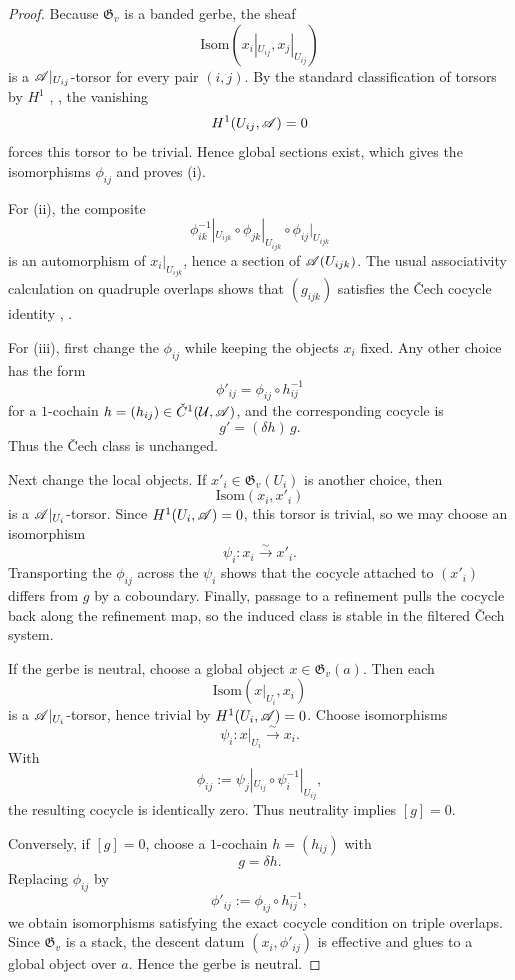 \begin{proof}
Because $\mathfrak G_v$ is a banded gerbe, the sheaf
\[
\mathrm{Isom}(x_i|_{U_{ij}},x_j|_{U_{ij}})
\]
is a $\mathscr{A}|_{U_{ij}}$-torsor for every pair $(i,j)$. By the standard classification of torsors by $H^1$ \cite[Chap.~III]{MacLaneMoerdijk1994}, \cite[Sec.~11]{StacksProject}, the vanishing
\[
H^1(U_{ij},\mathscr{A})=0
\]
forces this torsor to be trivial. Hence global sections exist, which gives the isomorphisms $\phi_{ij}$ and proves \textup{(i)}.

For \textup{(ii)}, the composite
\[
\phi_{ik}^{-1}|_{U_{ijk}}\circ \phi_{jk}|_{U_{ijk}}\circ \phi_{ij}|_{U_{ijk}}
\]
is an automorphism of $x_i|_{U_{ijk}}$, hence a section of $\mathscr{A}(U_{ijk})$. The usual associativity calculation on quadruple overlaps shows that $(g_{ijk})$ satisfies the \v{C}ech cocycle identity \cite[Chap.~IV]{Giraud1971}, \cite[Sec.~11]{StacksProject}.

For \textup{(iii)}, first change the $\phi_{ij}$ while keeping the objects $x_i$ fixed. Any other choice has the form
\[
\phi'_{ij}=\phi_{ij}\circ h_{ij}^{-1}
\]
for a $1$-cochain $h=(h_{ij})\in \check C^1(\mathcal U,\mathscr{A})$, and the corresponding cocycle is
\[
g'=(\delta h)\, g.
\]
Thus the \v{C}ech class is unchanged.

Next change the local objects. If $x'_i\in \mathfrak G_v(U_i)$ is another choice, then
\[
\mathrm{Isom}(x_i,x'_i)
\]
is a $\mathscr{A}|_{U_i}$-torsor. Since $H^1(U_i,\mathscr{A})=0$, this torsor is trivial, so we may choose an isomorphism
\[
\psi_i:x_i\xrightarrow{\sim} x'_i.
\]
Transporting the $\phi_{ij}$ across the $\psi_i$ shows that the cocycle attached to $(x'_i)$ differs from $g$ by a coboundary. Finally, passage to a refinement pulls the cocycle back along the refinement map, so the induced class is stable in the filtered \v{C}ech system.

If the gerbe is neutral, choose a global object $x\in \mathfrak G_v(a)$. Then each
\[
\mathrm{Isom}(x|_{U_i},x_i)
\]
is a $\mathscr{A}|_{U_i}$-torsor, hence trivial by $H^1(U_i,\mathscr{A})=0$. Choose isomorphisms
\[
\psi_i:x|_{U_i}\xrightarrow{\sim} x_i.
\]
With
\[
\phi_{ij}:=\psi_j|_{U_{ij}}\circ \psi_i^{-1}|_{U_{ij}},
\]
the resulting cocycle is identically zero. Thus neutrality implies $[g]=0$.

Conversely, if $[g]=0$, choose a $1$-cochain $h=(h_{ij})$ with
\[
g=\delta h.
\]
Replacing $\phi_{ij}$ by
\[
\phi'_{ij}:=\phi_{ij}\circ h_{ij}^{-1},
\]
we obtain isomorphisms satisfying the exact cocycle condition on triple overlaps. Since $\mathfrak G_v$ is a stack, the descent datum $(x_i,\phi'_{ij})$ is effective and glues to a global object over $a$. Hence the gerbe is neutral.
\end{proof}


